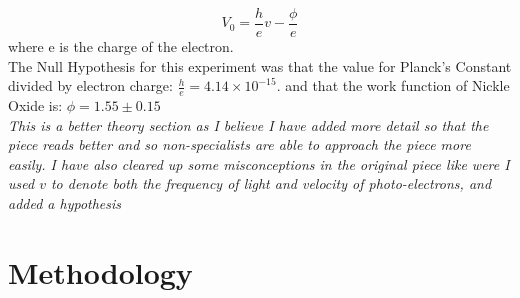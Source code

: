 \documentclass[12pt]{article}
\begin{document}
\begin{equation}
    V_{0}=\frac{h}{e}v-\frac{\phi}{e}
\end{equation}
where e is the charge of the electron.\\

The Null Hypothesis for this experiment was that the value for Planck's Constant divided by electron charge: $ \frac{h}{e}=4.14\times10^{-15}$. and that the work function of Nickle Oxide is: $\phi=1.55\pm0.15$\\

\textit{This is a better theory section as I believe I have added more detail so that the piece reads better and so non-specialists are able to approach the piece more easily. I have also cleared up some misconceptions in the original piece like were I used $v$ to denote both the frequency of light and velocity of photo-electrons, and added a hypothesis}


\section{Methodology}
\end{document}
